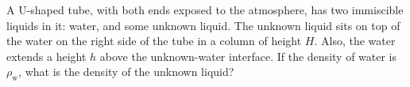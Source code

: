 A U-shaped tube, with both ends exposed to the atmosphere, has two
immiscible liquids in it: water, and some unknown liquid. The unknown liquid
sits on top of the water on the right side of the tube in a column of
height $H$. Also, the water extends a height $h$ above the
unknown-water interface. If the density of water is $\rho_\text{w}$,
what is the density of the unknown liquid?\answercheck
